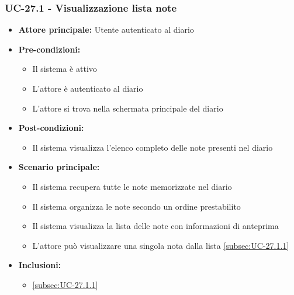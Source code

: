 \documentclass[a4paper,12pt]{article}
\begin{document}
\subsubsection{UC-27.1 - Visualizzazione lista note} \label{subsec:UC-27.1}
\begin{itemize}
    \item \textbf{Attore principale:} Utente autenticato al diario
    \item \textbf{Pre-condizioni:}
    \begin{itemize}
        \item Il sistema è attivo
        \item L'attore è autenticato al diario
        \item L'attore si trova nella schermata principale del diario
    \end{itemize}
    \item \textbf{Post-condizioni:} 
    \begin{itemize}
        \item Il sistema visualizza l'elenco completo delle note presenti nel diario
    \end{itemize}
    \item \textbf{Scenario principale:} 
    \begin{itemize}
        \item Il sistema recupera tutte le note memorizzate nel diario
        \item Il sistema organizza le note secondo un ordine prestabilito
        \item Il sistema visualizza la lista delle note con informazioni di anteprima
        \item L'attore può visualizzare una singola nota dalla lista \ref{subsec:UC-27.1.1}
    \end{itemize}
    \item \textbf{Inclusioni:}
    \begin{itemize}
        \item \ref{subsec:UC-27.1.1}
    \end{itemize}
\end{itemize}
\end{document}

